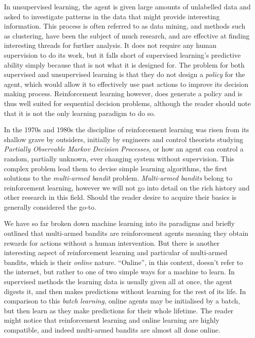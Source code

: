 \par In unsupervised learning, the agent is given large amounts of unlabelled data and asked to investigate patterns in the data that might provide interesting information. This process is often referred to as data mining, and methods such as clustering, have been the subject of much research, and are effective at finding interesting threads for further analysis. It does not require any human supervision to do its work, but it falls short of supervised learning's predictive ability simply because that is not what it is designed for. The problem for both supervised and unsupervised learning is that they do not design a {\em policy} for the agent, which would allow it to effectively use past actions to improve its decision making process. Reinforcement learning however, does generate a policy and is thus well suited for sequential decision problems, although the reader should note that it is not the only learning paradigm to do so.

\par In the 1970s and 1980s the discipline of reinforcement learning was risen from its shallow grave by outsiders, initially by engineers and control theorists studying {\em Partially Observable Markov Decision Processes}, or how an agent can control a random, partially unknown, ever changing system without supervision. This complex problem lead them to devise simple learning algorithms, the first solutions to the {\em multi-armed bandit} problem. {\em Multi-armed bandits} belong to reinforcement learning, however we will not go into detail on the rich history and other research in this field. Should the reader desire to acquire their basics \citet{sutton:1998} is generally considered the go-to. 

\par We have so far broken down machine learning into its paradigms and briefly outlined that multi-armed bandits are reinforcement agents meaning they obtain rewards for actions without a human intervention. But there is another interesting aspect of reinforcement learning and particular of multi-armed bandits, which is their {\em online} nature. ``Online'', in this context, doesn't refer to the internet, but rather to one of two simple ways for a machine to learn. In supervised methods the learning data is usually given all at once, the agent digests it, and then makes predictions without learning for the rest of its life. In comparison to this {\em batch learning}, online agents may be initialised by a batch, but then learn as they make predictions for their whole lifetime. The reader might notice that reinforcement learning and online learning are highly compatible, and indeed multi-armed bandits are almost all done online.  

